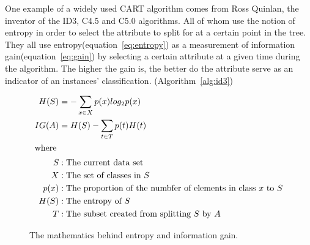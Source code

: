 	\bigskip\noindent
	One example of a widely used CART algorithm comes from Ross Quinlan, the inventor of the ID3, C4.5 and C5.0 algorithms. \cite{quinlan:id3, quinlan:c45}
	All of whom use the notion of entropy in order to select the attribute to split for at a certain point in the tree. 
	They all use entropy(equation~\ref{eq:entropy}) as a measurement of information gain(equation~\ref{eq:gain}) by selecting a certain attribute at a given time during the algorithm. 
	The higher the gain is, the better do the attribute serve as an indicator of an instances' classification. (Algorithm~\ref{alg:id3})
	\begin{figure}[H]
		\begin{align}
			H(S) &= -\sum_{x \in X}p(x)log_2p(x)\label{eq:entropy}\\
			IG(A) &= H(S) - \sum_{t \in T}p(t)H(t)\label{eq:gain}\\
			\intertext{where}
			S &: \text{The current data set}\nonumber\\
			X &: \text{The set of classes in $S$}\nonumber\\
			p(x) &: \text{The proportion of the numbfer of elements in class $x$ to $S$}\nonumber\\
			H(S) &: \text{The entropy of $S$}\nonumber\\
			T &:	 \text{The subset created from splitting $S$ by $A$}\nonumber
		\end{align}
		\caption{The mathematics behind entropy and information gain.}
	\end{figure}
	